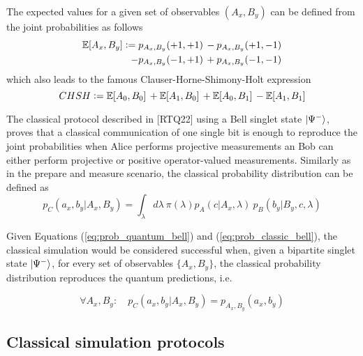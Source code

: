 The expected values for a given set of observables $(A_{x}, B_{y})$ can be defined from the joint probabilities as follows
\begin{equation}\label{eq:bell_expected_values}
\begin{split}
\mathbb{E}[A_{x}, B_{y}] \vcentcolon= p_{A_x,B_y}(+1, +1)\,- p_{A_x,B_y}(+1, -1)\\-p_{A_x,B_y}(-1, +1)\,+ p_{A_x,B_y}(-1, -1)
\end{split}
\end{equation}
which also leads to the famous Clauser-Horne-Shimony-Holt expression
\begin{equation}\label{eq:bell_inequality}
CHSH \vcentcolon= \mathbb{E}[A_{0},B_{0}]\,+\mathbb{E}[A_{1},B_{0}]\,+\mathbb{E}[A_{0},B_{1}]\,-\mathbb{E}[A_{1},B_{1}]
\end{equation}

The classical protocol described in [RTQ22] using a Bell singlet state $\ket{\Psi^{-}}$, proves that a classical communication of one single bit is enough to reproduce the joint probabilities when Alice performs projective measurements an Bob can either perform projective or positive operator-valued measurements. Similarly as in the prepare and measure scenario, the classical probability distribution can be defined as
\begin{equation}\label{eq:prob_classic_bell}
p_C(a_{x}, b_{y}|A_{x},B_{y}) = \int_{\lambda} d\lambda\ \pi(\lambda) p_A(c|A_{x}, \lambda)\ p_B(b_{y}|B_{y}, c, \lambda)
\end{equation}

Given Equations (\ref{eq:prob_quantum_bell}) and (\ref{eq:prob_classic_bell}), the classical simulation would be considered successful when, given a bipartite singlet state $\ket{\Psi^{-}}$, for every set of observables $\{A_{x}, B_{y}\}$, the classical probability distribution reproduces the quantum predictions, i.e.

\begin{equation}\label{eq:prob_classic_quantum_bell}
\forall A_{x}, B_{y}:\quad p_C(a_{x}, b_{y}|A_{x},B_{y}) = p_{A_x,B_y}(a_x, b_y)
\end{equation}

\subsection{Classical simulation protocols}\label{section:protocols}
